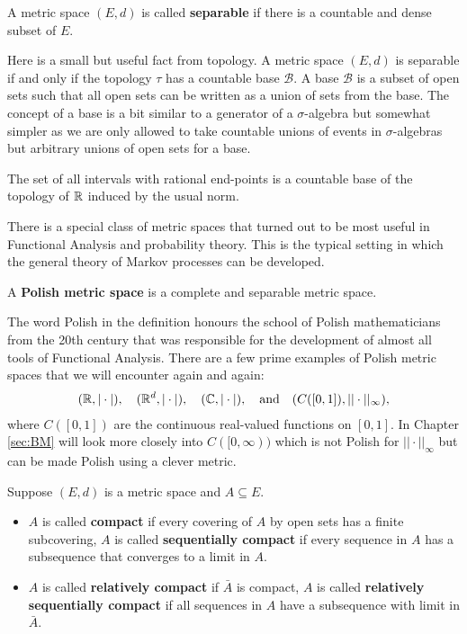 \begin{ldef}
\begin{deff}
	A metric space $(E,d)$ is called \textbf{separable} if there is a countable and dense subset of $E$.
\end{deff}
\end{ldef}
Here is a small but useful fact from topology. A metric space $(E,d)$ is separable if and only if the topology $\tau$ has a countable base $\mathcal B$. A  base $\mathcal B$ is a subset of open sets such that all open sets can be written as a union of sets from the base. The concept of a base is a bit similar to a generator of a $\sigma$-algebra but somewhat simpler as we are only allowed to take countable unions of events in $\sigma$-algebras but arbitrary unions of open sets for a base.
\begin{luebung}
	The set of all intervals with rational end-points is a countable base of the topology of $\mathbb{R}$ induced by the usual norm.
\end{luebung}
There is a special class of metric spaces that turned out to be most useful in Functional Analysis and probability theory. This is the typical setting in which the general theory of Markov processes can be developed.
\begin{ldef}
\begin{deff}
	A \textbf{Polish metric space} is a  complete and separable metric space.
\end{deff}
\end{ldef}
The word Polish in the definition honours the school of Polish mathematicians from the 20th century that was responsible for the development of almost all tools of Functional Analysis. There are a few prime examples of Polish metric spaces that we will encounter again and again:
\begin{align*}
	(\mathbb{R},|\cdot|),\quad (\mathbb{R}^d, |\cdot|),\quad (\mathbb{C},|\cdot|),\quad\text{and}\quad (C([0,1]),||\cdot||_\infty),
\end{align*}
where $C([0,1])$ are the continuous real-valued functions on $[0,1]$. In Chapter \ref{sec:BM} will look more closely into $C([0,\infty))$ which is not Polish for $||\cdot||_\infty$ but can be made Polish using a clever metric.
\begin{ldef}
\begin{deff}
	Suppose $(E,d)$ is a metric space and $A \subseteq E$. 
	\begin{itemize}
		\item
			$A$ is called \textbf{compact} if every covering of $A$ by open sets has a finite subcovering, $A$ is called \textbf{sequentially compact} if every sequence in $A$ has a subsequence that converges to a limit in $A$.
					\item
			$A$ is called \textbf{relatively compact} if $\bar{A}$ is compact, $A$ is called \textbf{relatively sequentially compact} if all sequences in $A$ have a subsequence with limit in $\bar{A}$.
	\end{itemize}
\end{deff}
\end{ldef}
